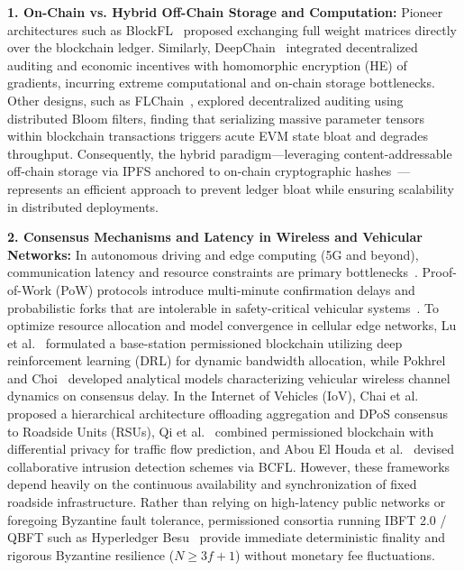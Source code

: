 \textbf{1. On-Chain vs. Hybrid Off-Chain Storage and Computation:} Pioneer architectures such as BlockFL~\cite{kim2019blockfl} proposed exchanging full weight matrices directly over the blockchain ledger. Similarly, DeepChain~\cite{weng2021deepchain} integrated decentralized auditing and economic incentives with homomorphic encryption (HE) of gradients, incurring extreme computational and on-chain storage bottlenecks. Other designs, such as FLChain~\cite{bao2019flchain}, explored decentralized auditing using distributed Bloom filters, finding that serializing massive parameter tensors within blockchain transactions triggers acute EVM state bloat and degrades throughput. Consequently, the hybrid paradigm—leveraging content-addressable off-chain storage via IPFS anchored to on-chain cryptographic hashes~\cite{zhao2021privacy, goh2023blockchain}—represents an efficient approach to prevent ledger bloat while ensuring scalability in distributed deployments.

\textbf{2. Consensus Mechanisms and Latency in Wireless and Vehicular Networks:} In autonomous driving and edge computing (5G and beyond), communication latency and resource constraints are primary bottlenecks~\cite{pokhrel2020federated, lu2020blockchain}. Proof-of-Work (PoW) protocols introduce multi-minute confirmation delays and probabilistic forks that are intolerable in safety-critical vehicular systems~\cite{kim2019blockfl}. To optimize resource allocation and model convergence in cellular edge networks, Lu et al.~\cite{lu2020blockchain} formulated a base-station permissioned blockchain utilizing deep reinforcement learning (DRL) for dynamic bandwidth allocation, while Pokhrel and Choi~\cite{pokhrel2020federated} developed analytical models characterizing vehicular wireless channel dynamics on consensus delay. In the Internet of Vehicles (IoV), Chai et al.~\cite{chai2021hierarchical} proposed a hierarchical architecture offloading aggregation and DPoS consensus to Roadside Units (RSUs), Qi et al.~\cite{qi2021privacy} combined permissioned blockchain with differential privacy for traffic flow prediction, and Abou El Houda et al.~\cite{abouelhouda2024blockchain} devised collaborative intrusion detection schemes via BCFL. However, these frameworks depend heavily on the continuous availability and synchronization of fixed roadside infrastructure. Rather than relying on high-latency public networks or foregoing Byzantine fault tolerance, permissioned consortia running IBFT 2.0 / QBFT such as Hyperledger Besu~\cite{pujol2024blockchain} provide immediate deterministic finality and rigorous Byzantine resilience ($N \ge 3f + 1$) without monetary fee fluctuations.

